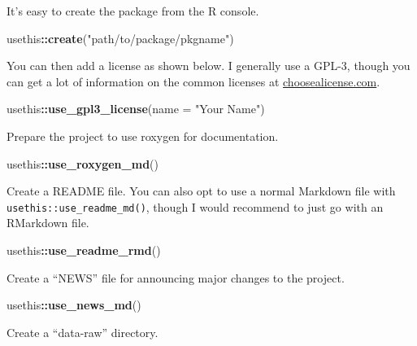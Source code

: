 \documentclass[]{book}
\newenvironment{Shaded}{\begin{snugshade}}{\end{snugshade}}
\newcommand{\DataTypeTok}[1]{\textcolor[rgb]{0.13,0.29,0.53}{#1}}
\newcommand{\KeywordTok}[1]{\textcolor[rgb]{0.13,0.29,0.53}{\textbf{#1}}}
\newcommand{\NormalTok}[1]{#1}
\newcommand{\OperatorTok}[1]{\textcolor[rgb]{0.81,0.36,0.00}{\textbf{#1}}}
\newcommand{\StringTok}[1]{\textcolor[rgb]{0.31,0.60,0.02}{#1}}
\begin{document}
It's easy to create the package from the R console.

\begin{Shaded}
\begin{Highlighting}[]
\NormalTok{usethis}\OperatorTok{::}\KeywordTok{create}\NormalTok{(}\StringTok{"path/to/package/pkgname"}\NormalTok{)}
\end{Highlighting}
\end{Shaded}

You can then add a license as shown below. I generally use a GPL-3, though you can get a lot of information on the common licenses at \href{https://choosealicense.com}{choosealicense.com}.

\begin{Shaded}
\begin{Highlighting}[]
\NormalTok{usethis}\OperatorTok{::}\KeywordTok{use_gpl3_license}\NormalTok{(}\DataTypeTok{name =} \StringTok{"Your Name"}\NormalTok{)}
\end{Highlighting}
\end{Shaded}

Prepare the project to use roxygen for documentation.

\begin{Shaded}
\begin{Highlighting}[]
\NormalTok{usethis}\OperatorTok{::}\KeywordTok{use_roxygen_md}\NormalTok{()}
\end{Highlighting}
\end{Shaded}

Create a README file. You can also opt to use a normal Markdown file with \texttt{usethis::use\_readme\_md()}, though I would recommend to just go with an RMarkdown file.

\begin{Shaded}
\begin{Highlighting}[]
\NormalTok{usethis}\OperatorTok{::}\KeywordTok{use_readme_rmd}\NormalTok{()}
\end{Highlighting}
\end{Shaded}

Create a ``NEWS'' file for announcing major changes to the project.

\begin{Shaded}
\begin{Highlighting}[]
\NormalTok{usethis}\OperatorTok{::}\KeywordTok{use_news_md}\NormalTok{()}
\end{Highlighting}
\end{Shaded}

Create a ``data-raw'' directory.
\end{document}
